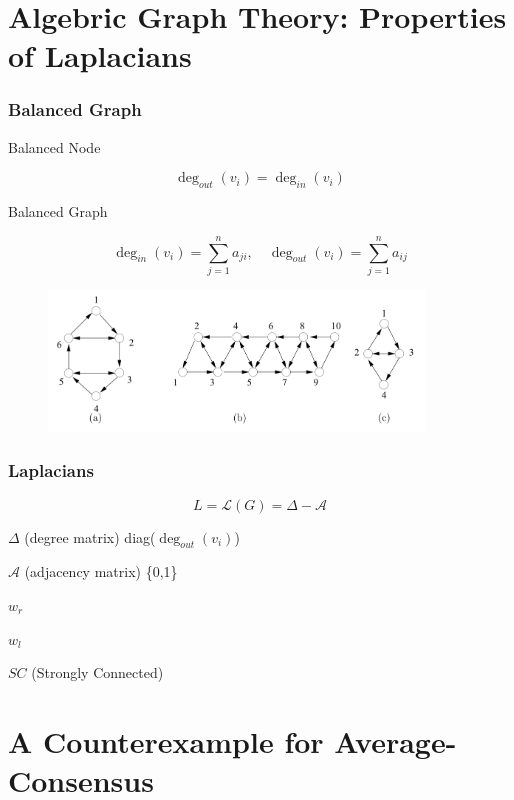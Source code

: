 \documentclass{beamer}
\begin{document}

\section{Algebric Graph Theory: Properties of Laplacians}

\begin{frame}
    \frametitle{Balanced Graph}
    
        Balanced Node

        $$\deg_{out}(v_i) = \deg_{in}(v_i)$$

        Balanced Graph

        $$\deg_{in}(v_i) = \sum_{j=1}^{n}a_{ji},\quad \deg_{out}(v_i) = \sum_{j=1}^{n}a_{ij}$$

        \begin{figure}[htbp]
            \centering
            \includegraphics[width=10cm]{figures/Fig3-BalancedGraphs.jpeg}
            \label{BalancedGraphs}
        \end{figure}
    \end{frame}
\begin{frame}
\frametitle{Laplacians}

    $$L = \mathcal{L}(G) = \Delta-\mathcal{A}$$ %
    
    $\Delta$ (degree matrix) diag($\deg_{out}(v_i)$) %
    
    $\mathcal{A}$ (adjacency matrix) \{0,1\}

    $w_r$
    
    $w_l$

    $SC$ (Strongly Connected)

\end{frame}

\section{A Counterexample for Average-Consensus}
\end{document}
